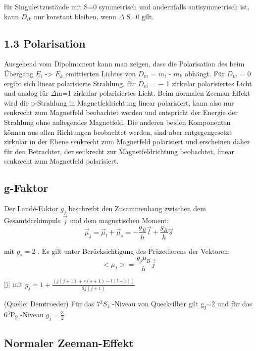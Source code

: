 \documentclass[10pt,a4paper]{article}
\begin{document}
für Singulettzustände mit S=0 symmetrisch und andernfalls antisymmetrisch ist, kann $D_{ik}$ nur konstant bleiben, wenn $\Delta$ S=0 gilt.


\subsection{1.3 Polarisation}


Ausgehend vom Dipolmoment kann man zeigen, dass die Polarisation des beim Übergang $E_i$ -> $E_k$  emittierten Lichtes von $D_m$ = $m_{i}$ - $m_{k}$  abhängt. Für $D_{m}$ =  0 ergibt sich linear polarisierte Strahlung, für $D_m$ = − 1 zirkular polarisiertes Licht und analog für $\Delta$m=1 zirkular polarisiertes Licht. Beim normalen Zeeman-Effekt wird die p-Strahlung in Magnetfeldrichtung linear polarisiert, kann also nur senkrecht zum Magnetfeld beobachtet werden und entspricht der Energie der Strahlung ohne anliegendes Magnetfeld. Die anderen beiden Komponenten können aus allen Richtungen beobachtet werden, sind aber entgegengesetzt zirkular in der Ebene senkrecht zum Magnetfeld polarisiert und erscheinen daher für den Betrachter, der senkrecht zur Magnetfeldrichtung beobachtet, linear senkrecht zum Magnetfeld polarisiert.

\subsection{ g-Faktor}

Der Landé-Faktor $g_j$ beschreibt den Zusammenhang zwischen dem Gesamtdrehimpuls $\overrightarrow{j}$ und dem magnetischen Moment:
\begin{equation}
\overrightarrow{\mu}_{j}= \overrightarrow{\mu}_{l}+\overrightarrow{\mu}_{s}=−
\frac {g_{B}}{h}
\overrightarrow{l} + \frac {g_{B}}{h}
\overrightarrow{s}
\end{equation}

mit $g_{s} = 2$ .  Es gilt unter Berücksichtigung des Präzedierens der Vektoren:
\begin{equation}
<\mu_{j}>= \frac {g_{j}\mu_{B}}{h}\overrightarrow{j}
\end{equation}

|j| mit $g_{j}=1+\frac{(j(j+1)+s(s+1)−l(l+1))}{2j(j+1)}$

(Quelle: Demtroeder)
Für das 7$^3S_{1}$ -Niveau von Quecksilber gilt g\textsubscript{j}=2 und für das 6$^3$P\textsubscript{2} -Niveau $g_{j}=\frac{3}{2} $.

\subsection{Normaler Zeeman-Effekt}
\end{document}
